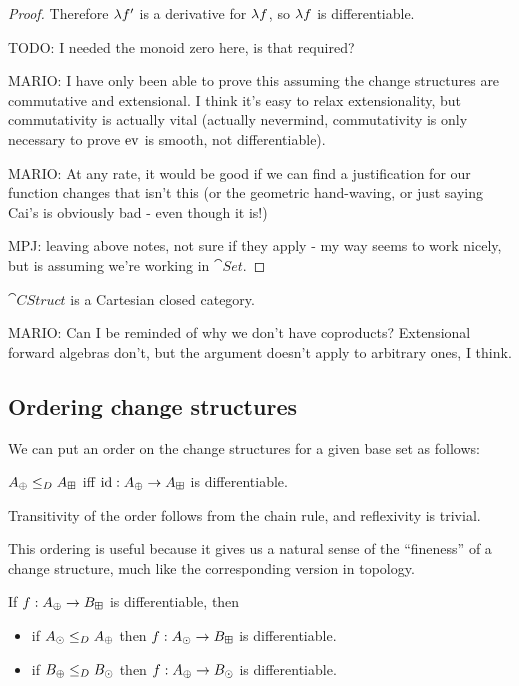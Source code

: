 \begin{proof}
  Therefore $\lambda f'$ is a derivative for $\lambda f$, so $\lambda f$
  is differentiable.

  TODO: I needed the monoid zero here, is that required?

  MARIO: I have only been able to prove this assuming the change structures are
  commutative and extensional. I think it's easy to relax extensionality, but
  commutativity is actually vital (actually nevermind, commutativity is only necessary
  to prove $\operatorname{ev}$ is smooth, not differentiable).

  MARIO: At any rate, it would be good if we can find a justification for our
  function changes that isn't this (or the geometric hand-waving, or just saying
  Cai's is obviously bad - even though it is!)
  
  MPJ: leaving above notes, not sure if they apply - my way seems to work
  nicely, but is assuming we're working in $\cat{Set}$.
\end{proof}

\begin{thm}
  $\cat{CStruct}$ is a Cartesian closed category.
\end{thm}

MARIO: Can I be reminded of why we don't have coproducts? Extensional forward algebras
don't, but the argument doesn't apply to arbitrary ones, I think.

\subsection{Ordering change structures}

We can put an order on the change structures for a given base set as follows:

\begin{defn}
  $A_\oplus \leq_D A_\boxplus$ iff $\textrm{id}: A_\oplus \rightarrow A_\boxplus$ is differentiable.
\end{defn}

Transitivity of the order follows from the chain rule, and reflexivity is trivial.

This ordering is useful because it gives us a natural sense of the ``fineness''
of a change structure, much like the corresponding version in topology.

\begin{prop}
  If $f: A_\oplus \rightarrow B_\boxplus$ is differentiable, then
  \begin{itemize}
    \item if $A_\odot \leq_D A_\oplus$ then $f: A_\odot \rightarrow
      B_\boxplus$ is differentiable.
    \item if $B_\oplus \leq_D B_\odot$ then $f: A_\oplus \rightarrow
      B_\odot$ is differentiable.
  \end{itemize}
\end{prop}

